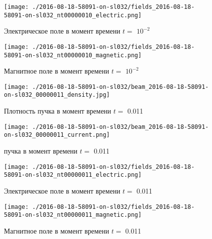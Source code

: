 \documentclass[a4paper,14pt]{extreport}
\begin{document}
\begin{center}
\begin{figure}[!hbt]
\texttt{[image: ./2016-08-18-58091-on-sl032/fields\_2016-08-18-58091-on-sl032\_nt00000010\_electric.png]}
\caption{\label{electric_10_42} Электрическое поле  в момент времени $t = $ $10^{-2}$ }
\end{figure}
\end{center}
\begin{center}
\begin{figure}[!hbt]
\texttt{[image: ./2016-08-18-58091-on-sl032/fields\_2016-08-18-58091-on-sl032\_nt00000010\_magnetic.png]}
\caption{\label{magnetic_10_43} Магнитное поле  в момент времени $t = $ $10^{-2}$ }
\end{figure}
\end{center}
\begin{center}
\begin{figure}[!hbt]
\texttt{[image: ./2016-08-18-58091-on-sl032/beam\_2016-08-18-58091-on-sl032\_00000011\_density.jpg]}
\caption{\label{density_beam11_44} Плотность пучка в момент времени $t = $ 0.011 }
\end{figure}
\end{center}
\begin{center}
\begin{figure}[!hbt]
\texttt{[image: ./2016-08-18-58091-on-sl032/beam\_2016-08-18-58091-on-sl032\_00000011\_current.png]}
\caption{\label{current_beam11_45}  пучка в момент времени $t = $ 0.011 }
\end{figure}
\end{center}
\begin{center}
\begin{figure}[!hbt]
\texttt{[image: ./2016-08-18-58091-on-sl032/fields\_2016-08-18-58091-on-sl032\_nt00000011\_electric.png]}
\caption{\label{electric_11_46} Электрическое поле  в момент времени $t = $ 0.011 }
\end{figure}
\end{center}
\begin{center}
\begin{figure}[!hbt]
\texttt{[image: ./2016-08-18-58091-on-sl032/fields\_2016-08-18-58091-on-sl032\_nt00000011\_magnetic.png]}
\caption{\label{magnetic_11_47} Магнитное поле  в момент времени $t = $ 0.011 }
\end{figure}
\end{center}
\end{document}
